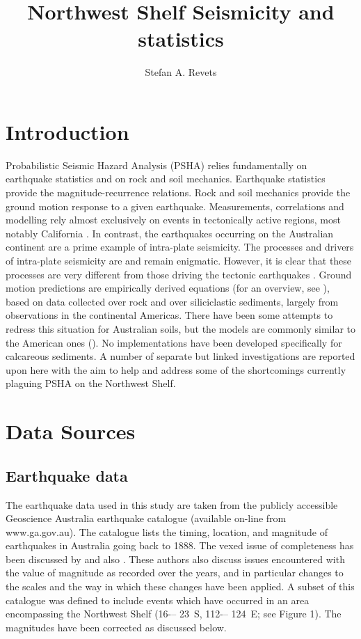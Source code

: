 \documentclass{report}
\title{Northwest Shelf Seismicity and statistics}
\author{Stefan A. Revets}
\date{}
\begin{document}
\maketitle
\chapter{Introduction}

Probabilistic Seismic Hazard Analysis (PSHA) relies fundamentally on
earthquake statistics and on rock and soil mechanics. Earthquake
statistics provide the magnitude-recurrence relations. Rock and soil
mechanics provide the ground motion response to a given earthquake.
Measurements, correlations and modelling rely almost exclusively on
events in tectonically active regions, most notably California
\cite{gutenberg-richter44:frequency,knopoff_al82:b-values,kaklamanos_al10:implementation}.
In contrast, the earthquakes occurring on the Australian continent are
a prime example of intra-plate seismicity. The processes and drivers
of intra-plate seismicity are and remain enigmatic. However, it is
clear that these processes are very different from those driving the
tectonic earthquakes \cite{stein07:approaches}. Ground motion
predictions are empirically derived equations (for an overview, see
), based on data collected over
rock and over siliciclastic sediments, largely from observations in
the continental Americas. There have been some attempts to redress
this situation for Australian soils, but the models are commonly
similar to the American ones
(\cite{lam_wilson08:new,leonard-al07:model}). No implementations have
been developed specifically for calcareous sediments.  A number of
separate but linked investigations are reported upon here with the aim
to help and address some of the shortcomings currently plaguing PSHA
on the Northwest Shelf.

\chapter{Data Sources}
\section{Earthquake data} 
The earthquake data used in this study are taken from the publicly
accessible Geoscience Australia earthquake catalogue (available
on-line from www.ga.gov.au). The catalogue lists the timing, location,
and magnitude of earthquakes in Australia going back to 1888. The
vexed issue of completeness has been discussed by
 and also
. These authors also discuss issues
encountered with the value of magnitude as recorded over the years,
and in particular changes to the scales and the way in which these
changes have been applied.  A subset of this catalogue was defined to
include events which have occurred in an area encompassing the
Northwest Shelf (16\degree -– 23\degree\ S, 112\degree -– 124\degree\ E;
see Figure 1). The magnitudes have been corrected as discussed below.
\end{document}
